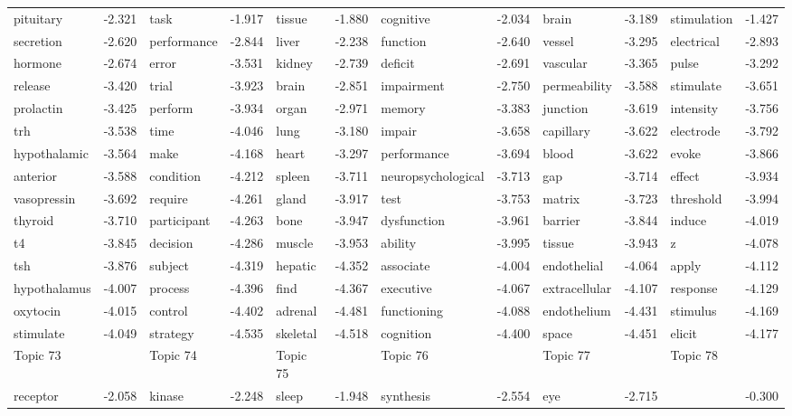 \documentclass{article}
\begin{document}
\begin{table}
{\begin{tabular}{|l r|l r|l r|l r|l r|l r|}
\hline
pituitary & -2.321 & task & -1.917 & tissue & -1.880 & cognitive & -2.034 & brain & -3.189 & stimulation & -1.427\\
secretion & -2.620 & performance & -2.844 & liver & -2.238 & function & -2.640 & vessel & -3.295 & electrical & -2.893\\
hormone & -2.674 & error & -3.531 & kidney & -2.739 & deficit & -2.691 & vascular & -3.365 & pulse & -3.292\\
release & -3.420 & trial & -3.923 & brain & -2.851 & impairment & -2.750 & permeability & -3.588 & stimulate & -3.651\\
prolactin & -3.425 & perform & -3.934 & organ & -2.971 & memory & -3.383 & junction & -3.619 & intensity & -3.756\\
trh & -3.538 & time & -4.046 & lung & -3.180 & impair & -3.658 & capillary & -3.622 & electrode & -3.792\\
hypothalamic & -3.564 & make & -4.168 & heart & -3.297 & performance & -3.694 & blood & -3.622 & evoke & -3.866\\
anterior & -3.588 & condition & -4.212 & spleen & -3.711 & neuropsychological & -3.713 & gap & -3.714 & effect & -3.934\\
vasopressin & -3.692 & require & -4.261 & gland & -3.917 & test & -3.753 & matrix & -3.723 & threshold & -3.994\\
thyroid & -3.710 & participant & -4.263 & bone & -3.947 & dysfunction & -3.961 & barrier & -3.844 & induce & -4.019\\
t4 & -3.845 & decision & -4.286 & muscle & -3.953 & ability & -3.995 & tissue & -3.943 & z & -4.078\\
tsh & -3.876 & subject & -4.319 & hepatic & -4.352 & associate & -4.004 & endothelial & -4.064 & apply & -4.112\\
hypothalamus & -4.007 & process & -4.396 & find & -4.367 & executive & -4.067 & extracellular & -4.107 & response & -4.129\\
oxytocin & -4.015 & control & -4.402 & adrenal & -4.481 & functioning & -4.088 & endothelium & -4.431 & stimulus & -4.169\\
stimulate & -4.049 & strategy & -4.535 & skeletal & -4.518 & cognition & -4.400 & space & -4.451 & elicit & -4.177\\
\hline
\hline
Topic 73 & &Topic 74 & &Topic 75 & &Topic 76 & &Topic 77 & &Topic 78 &\\
\hline
receptor & -2.058 & kinase & -2.248 & sleep & -1.948 & synthesis & -2.554 & eye & -2.715 &  & -0.300\\

\end{tabular}}
\end{table}
\end{document}

